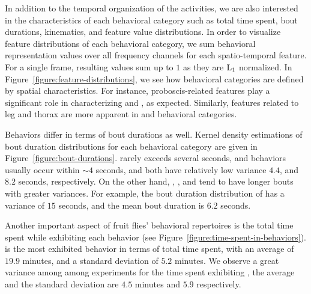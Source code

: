 In addition to the temporal organization of the activities, we are also interested in the characteristics of each behavioral category such as total time spent, bout durations, kinematics, and feature value distributions.
In order to visualize feature distributions of each behavioral category, we sum behavioral representation values over all frequency channels for each spatio-temporal feature.
For a single frame, resulting values sum up to $1$ as they are $\textnormal{L}_1$ normalized.
In Figure~\ref{figure:feature-distributions}, we see how behavioral categories are defined by spatial characteristics.
For instance, proboscis-related features play a significant role in characterizing \Feeding and \ProboscisPumping, as expected.
Similarly, features related to leg and thorax are more apparent in \Grooming and \PosturalAdjustment behavioral categories.

Behaviors differ in terms of bout durations as well.
Kernel density estimations of bout duration distributions for each behavioral category are given in Figure~\ref{figure:bout-durations}.
\CHaltereSwitch rarely exceeds several seconds, and \PosturalAdjustment behaviors usually occur within ${\sim}4$ seconds, and both have relatively low variance $4.4$, and $8.2$ seconds, respectively.
On the other hand, \CFeeding, \ProboscisPumping, and \Grooming tend to have longer bouts with greater variances.
For example, the bout duration distribution of \Grooming has a variance of $15$ seconds, and the mean bout duration is $6.2$ seconds.

Another important aspect of fruit flies' behavioral repertoires is the total time spent while exhibiting each behavior (see Figure~\ref{figure:time-spent-in-behaviors}).
\CGrooming is the most exhibited behavior in terms of total time spent, with an average of $19.9$ minutes, and a standard deviation of $5.2$ minutes.
We observe a great variance among among experiments for the time spent exhibiting \HaltereSwitch, the average and the standard deviation are $4.5$ minutes and $5.9$ respectively.

